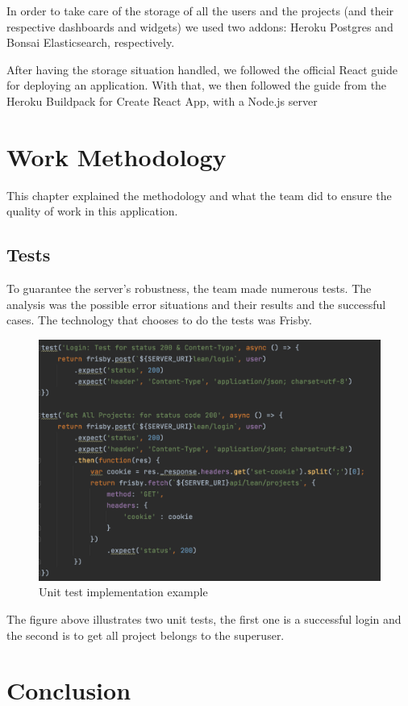 \documentclass[a4paper,twoside,10pt]{report}
\begin{document}
In order to take care of the storage of all the users and the projects (and their respective dashboards and widgets) we used two addons: Heroku Postgres\cite{HEROKUPOSTGRES} and Bonsai Elasticsearch\cite{BONSAIELASTICSEARCH}, respectively.

After having the storage situation handled, we followed the official React guide for deploying an application\cite{REACTDEPLOYMENT}. With that, we then followed the guide from the Heroku Buildpack for Create React App, with a Node.js server

\chapter{Work Methodology}
This chapter explained the methodology and what the team did to ensure the quality of work in this application. 

\section{Tests}
To guarantee the server's robustness, the team made numerous tests. The analysis was the possible error situations and their results and the successful cases.  The technology that chooses to do the tests was Frisby.
\begin{figure}[h!]
\center
    \includegraphics[width=\textwidth]{tests.png}
\caption{Unit test implementation example}
\end{figure}

The figure above illustrates two unit tests, the first one is a successful login and the second is to get all project belongs to the superuser.
\chapter{Conclusion}
\end{document}
